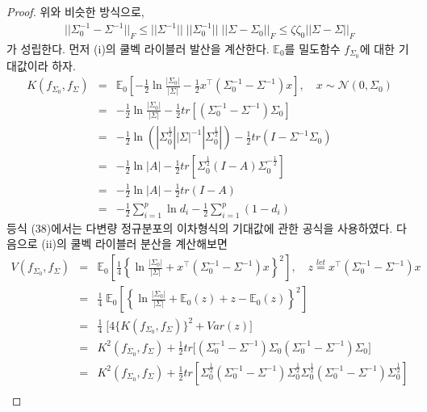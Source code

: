 \begin{proof}
    위와 비슷한 방식으로, 
    \begin{align}
      || \Sigma_0^{-1} - \Sigma^{-1} ||_F \leq || \Sigma^{-1} || \; || \Sigma_0^{-1} || \; || \Sigma - \Sigma_0 ||_F \leq \zeta \zeta_0 || \Sigma - \Sigma ||_F
    \end{align}
    가 성립한다. 먼저 (i)의 쿨벡 라이블러 발산을 계산한다. $\mathbb{E}_0$를 밀도함수 $f_{\Sigma_0}$에 대한 기대값이라 하자.
    \begin{eqnarray}
      K(f_{\Sigma_0}, f_\Sigma) &=& \mathbb{E}_0 \left[ -\frac{1}{2} \ln{\frac{|\Sigma_0|}{|\Sigma|}} - \frac{1}{2} x^\top (\Sigma_0^{-1} - \Sigma^{-1}) x \right], \quad x \sim \mathcal{N}(0, \Sigma_0) \\
      &=& - \frac{1}{2} \ln{\frac{|\Sigma_0|}{|\Sigma|}} - \frac{1}{2} tr \left[ (\Sigma_0^{-1} - \Sigma^{-1}) \Sigma_0 \right] \\
      &=& - \frac{1}{2} \ln{(|\Sigma_0^{\frac{1}{2}}| |\Sigma|^{-1} |\Sigma_0^{\frac{1}{2}}|)} - \frac{1}{2} tr(I - \Sigma^{-1}\Sigma_0)  \\
      &=& - \frac{1}{2} \ln{|A|} - \frac{1}{2} tr \left[ \Sigma_0^{\frac{1}{2}} (I - A) \Sigma_0^{-\frac{1}{2}} \right] \\
      &=& - \frac{1}{2} \ln{|A|} - \frac{1}{2} tr(I -A) \\
      &=& - \frac{1}{2} \sum_{i=1}^{p} \ln{d_i} - \frac{1}{2} \sum_{i=1}^{p} (1 - d_i)
    \end{eqnarray}
    등식 (38)에서는 다변량 정규분포의 이차형식의 기대값에 관한 공식을 사용하였다.
    다음으로 (ii)의 쿨벡 라이블러 분산을 계산해보면
    \begin{eqnarray}
      V(f_{\Sigma_0}, f_\Sigma) &=& \mathbb{E}_0 \left[ \frac{1}{4} \left\{ \ln{\frac{|\Sigma_0|}{|\Sigma|}} + x^\top (\Sigma_0^{-1} - \Sigma^{-1}) x \right\}^2 \right], \quad z \stackrel{let}{=} x^\top (\Sigma_0^{-1} - \Sigma^{-1}) x  \\
      &=& \frac{1}{4} \; \mathbb{E}_0 \left[ \left\{ \ln{\frac{|\Sigma_0|}{|\Sigma|}} + \mathbb{E}_0 (z) + z - \mathbb{E}_0 (z) \right\}^2 \right] \\
      &=& \frac{1}{4} \; \bigg[ 4 \big\{ K (f_{\Sigma_0}, f_\Sigma) \big\}^2 + Var(z) \bigg]  \\
      &=& K^2 (f_{\Sigma_0}, f_\Sigma) + \frac{1}{2} tr \bigg[ (\Sigma_0^{-1} - \Sigma^{-1}) \Sigma_0 (\Sigma_0^{-1} - \Sigma^{-1}) \Sigma_0 \bigg] \\
      &=& K^2 (f_{\Sigma_0}, f_\Sigma) + \frac{1}{2} tr \left[ \Sigma_0^{\frac{1}{2}} (\Sigma_0^{-1} - \Sigma^{-1}) \Sigma_0^{\frac{1}{2}} \Sigma_0^{\frac{1}{2}} (\Sigma_0^{-1} - \Sigma^{-1}) \Sigma_0^{\frac{1}{2}} \right]  \\

\end{eqnarray}
\end{proof}
